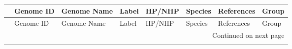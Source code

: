 \begin{longtable}{llllllll}
\toprule
{} &     Genome ID &                                                              Genome Name & Label &    HP/NHP &                                        Species &                                                    References & Group \\
\midrule
\endfirsthead

\toprule
{} &     Genome ID &                                                              Genome Name & Label &    HP/NHP &                                        Species &                                                    References & Group \\
\midrule
\endhead
\midrule
\multicolumn{8}{r}{{Continued on next page}} \\
\midrule
\endfoot


\end{longtable}
